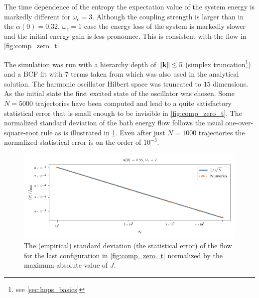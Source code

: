 The time dependence of the entropy the expectation value of the system
energy is markedly different for \(ω_c=3\). Although the coupling
strength is larger than in the \(α(0)=0.32,\, ω_c=1\) case the energy
loss of the system is markedly slower and the initial energy gain is
less pronounce. This is consistent with the flow in
\cref{fig:comp_zero_t}.

The simulation was run with a hierarchy depth of \(\norm{\vb{k}} \leq 5\)
(simplex truncation\footnote{see \cref{sec:hops_basics}}) and a BCF
fit with \(7\) terms taken from \cite{RichardDiss} which was also used
in the analytical solution. The harmonic oscillator Hilbert space was
truncated to \(15\) dimensions. As the initial state the first excited
state of the oscillator was chosen. Some \(N=5000\) trajectories have
been computed and lead to a quite satisfactory statistical error that
is small enough to be invisible in \cref{fig:comp_zero_t}. The
normalized standard deviation of the bath energy flow follows the
usual one-over-square-root rule as is illustrated in
\cref{fig:sqrt_conv}. Even after just \(N=1000\) trajectories the
normalized statistical error is on the order of \(10^{-3}\).
\begin{figure}[h]
  \centering
  \includegraphics{figs/analytic_comp/sqrt_convergence.pdf}
  \caption{\label{fig:sqrt_conv} The (empirical) standard deviation
    (the statistical error) of the flow for the last configuration in
    \cref{fig:comp_zero_t} normalized by the maximum absolute value of
    \(J\).}
\end{figure}
